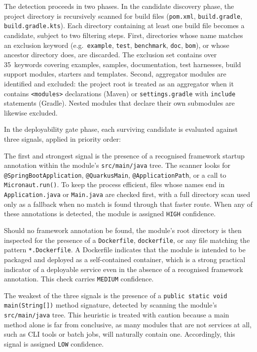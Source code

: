 The detection proceeds in two phases. In the candidate discovery phase, the project directory is recursively scanned for build files (\texttt{pom.xml}, \texttt{build.gradle}, \texttt{build\-.gradle\-.kts}). Each directory containing at least one build file becomes a candidate, subject to two filtering steps. First, directories whose name matches an exclusion keyword (e.g.\ \texttt{example}, \texttt{test}, \texttt{benchmark}, \texttt{doc}, \texttt{bom}), or whose ancestor directory does, are discarded. The exclusion set contains over 35~keywords covering examples, samples, documentation, test harnesses, build support modules, starters and templates. Second, aggregator modules are identified and excluded: the project root is treated as an aggregator when it contains \texttt{<modules>} declarations (Maven) or \texttt{settings.gradle} with \texttt{include} statements (Gradle). Nested modules that declare their own submodules are likewise excluded.

In the deployability gate phase, each surviving candidate is evaluated against three signals, applied in priority order:

The first and strongest signal is the presence of a recognised framework startup annotation
within the module's \texttt{src/main/java} tree. The scanner looks for
\texttt{@Spring\-Boot\-Application}, \texttt{@QuarkusMain}, \texttt{@ApplicationPath}, or a
call to \texttt{Micro\-naut.run()}. To keep the process efficient, files whose names end in
\texttt{App\-li\-cation.java} or \texttt{Main.java} are checked first, with a full directory
scan used only as a fallback when no match is found through that faster route. When any of
these annotations is detected, the module is assigned \texttt{HIGH} confidence.

Should no framework annotation be found, the module's root directory is then inspected for
the presence of a \texttt{Dockerfile}, \texttt{dockerfile}, or any file matching the pattern
\texttt{*.Dockerfile}. A Dockerfile indicates that the module is intended to be packaged and
deployed as a self-contained container, which is a strong practical indicator of a deployable
service even in the absence of a recognised framework annotation. This check carries
\texttt{MEDIUM} confidence.

The weakest of the three signals is the presence of a \texttt{public static void main(String[])}
method signature, detected by scanning the module's \texttt{src/main/java} tree. This
heuristic is treated with caution because a main method alone is far from conclusive, as many
modules that are not services at all, such as CLI tools or batch jobs, will naturally contain
one. Accordingly, this signal is assigned \texttt{LOW} confidence.

